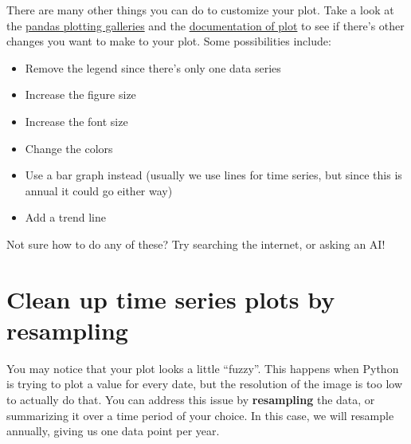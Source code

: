 \documentclass[
  letterpaper,
  DIV=11,
  numbers=noendperiod,
  oneside]{scrreprt}
\providecommand{\tightlist}{%
  \setlength{\itemsep}{0pt}\setlength{\parskip}{0pt}}
\begin{document}
\begin{tcolorbox}[enhanced jigsaw, colbacktitle=quarto-callout-color!10!white, opacityback=0, bottomtitle=1mm, toptitle=1mm, bottomrule=.15mm, left=2mm, colframe=quarto-callout-color-frame, leftrule=.75mm, opacitybacktitle=0.6, colback=white, rightrule=.15mm, toprule=.15mm, breakable, titlerule=0mm, title=\textcolor{quarto-callout-color}{\faInfo}\hspace{0.5em}{Looking for an Extra Challenge?}, coltitle=black, arc=.35mm]

There are many other things you can do to customize your plot. Take a
look at the
\href{https://pandas.pydata.org/docs/user_guide/visualization.html}{pandas
plotting galleries} and the
\href{https://pandas.pydata.org/docs/reference/api/pandas.DataFrame.plot.html}{documentation
of plot} to see if there's other changes you want to make to your plot.
Some possibilities include:

\begin{itemize}
\tightlist
\item
  Remove the legend since there's only one data series
\item
  Increase the figure size
\item
  Increase the font size
\item
  Change the colors
\item
  Use a bar graph instead (usually we use lines for time series, but
  since this is annual it could go either way)
\item
  Add a trend line
\end{itemize}

Not sure how to do any of these? Try searching the internet, or asking
an AI!

\end{tcolorbox}

\section{Clean up time series plots by
resampling}\label{clean-up-time-series-plots-by-resampling}

You may notice that your plot looks a little ``fuzzy''. This happens
when Python is trying to plot a value for every date, but the resolution
of the image is too low to actually do that. You can address this issue
by \textbf{resampling} the data, or summarizing it over a time period of
your choice. In this case, we will resample annually, giving us one data
point per year.
\end{document}
